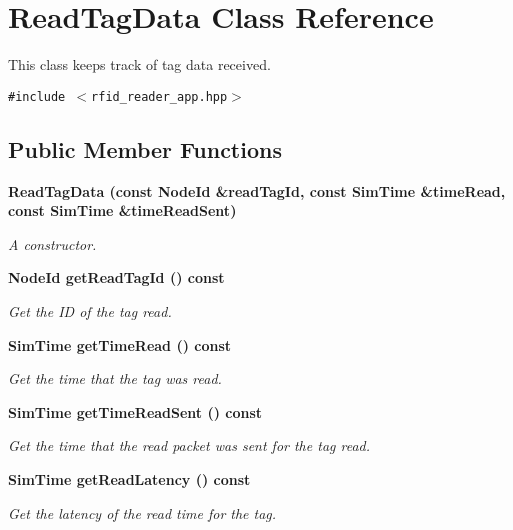 \section{Read\-Tag\-Data Class Reference}
\label{classReadTagData}
This class keeps track of tag data received.  


{\tt \#include $<$rfid\_\-reader\_\-app.hpp$>$}

\subsection*{Public Member Functions}
\begin{CompactItemize}
\item 
\bf{Read\-Tag\-Data} (const \bf{Node\-Id} \&read\-Tag\-Id, const \bf{Sim\-Time} \&time\-Read, const \bf{Sim\-Time} \&time\-Read\-Sent)\label{classReadTagData_c67964cb156c308dd3ab6e939bcdcbdf}

\begin{CompactList}\small\item\em A constructor. \item\end{CompactList}\item 
\bf{Node\-Id} \bf{get\-Read\-Tag\-Id} () const 
\begin{CompactList}\small\item\em Get the ID of the tag read. \item\end{CompactList}\item 
\bf{Sim\-Time} \bf{get\-Time\-Read} () const 
\begin{CompactList}\small\item\em Get the time that the tag was read. \item\end{CompactList}\item 
\bf{Sim\-Time} \bf{get\-Time\-Read\-Sent} () const 
\begin{CompactList}\small\item\em Get the time that the read packet was sent for the tag read. \item\end{CompactList}\item 
\bf{Sim\-Time} \bf{get\-Read\-Latency} () const 
\begin{CompactList}\small\item\em Get the latency of the read time for the tag. \item\end{CompactList}\end{CompactItemize}
